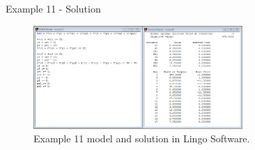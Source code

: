 \begin{frame}{Example 11 - Solution}
\begin{figure}
    \includegraphics[width=300px]{slides/ex11/screenshot.png}
    \caption{Example 11 model and solution in Lingo Software.}
\end{figure}
\end{frame}
